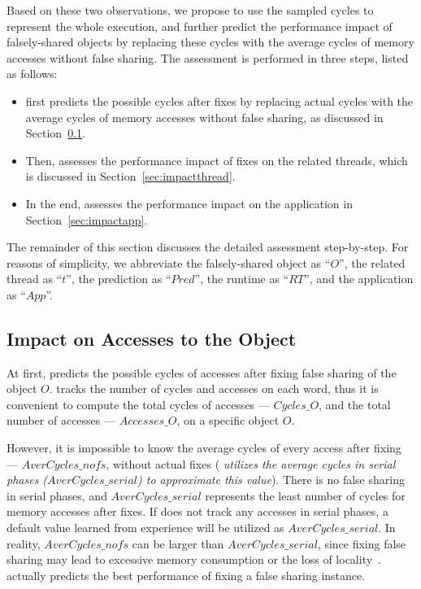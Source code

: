 Based on these two observations, we propose to use the sampled cycles to represent the whole execution, and further predict the performance impact of falsely-shared objects by replacing these cycles with the average cycles of memory accesses without false sharing. The assessment is performed in three steps, listed as follows: 

\begin{itemize}
\item \cheetah{} first predicts the possible cycles after fixes by replacing actual cycles with the average cycles of memory accesses without false sharing, as discussed in Section~\ref{sec:impactobject}. 

\item Then, \cheetah{} assesses the performance impact of fixes on the related threads, which is discussed in Section~\ref{sec:impactthread}. 
 
\item In the end, \cheetah{} assesses the performance impact on the application in Section~\ref{sec:impactapp}. 
\end{itemize}

The remainder of this section discusses the detailed assessment step-by-step. For reasons of simplicity, we abbreviate the falsely-shared object as ``$O$'', the related thread as ``$t$'', the prediction as ``$Pred$'', the runtime as ``$RT$'', and the application as ``$App$''. 

\subsection{Impact on Accesses to the Object}
\label{sec:impactobject}

At first, \cheetah{} predicts the possible cycles of accesses after fixing false sharing of the object $O$. \cheetah{} tracks the number of cycles and accesses on each word, thus it is convenient to compute the total cycles of accesses --- $Cycles\_O$, and the total number of accesses --- $Accesses\_O$, on a specific object $O$.  

However, it is impossible to know the average cycles of every access after fixing --- $AverCycles\_{nofs}$, without actual fixes ({\it \cheetah{} utilizes the average cycles in serial phases ($AverCycles\_{serial}$) to approximate this value}). There is no false sharing in serial phases, and $AverCycles\_{serial}$ represents the least number of cycles for memory accesses after fixes. If \cheetah{} does not track any accesses in serial phases, a default value learned from experience will be utilized as $AverCycles\_{serial}$. In reality, $AverCycles\_{nofs}$ can be larger than $AverCycles\_{serial}$, since fixing false sharing may lead to excessive memory consumption or the loss of locality~\cite{qinzhao}. \cheetah{} actually predicts the best performance of fixing a false sharing instance. 
 
